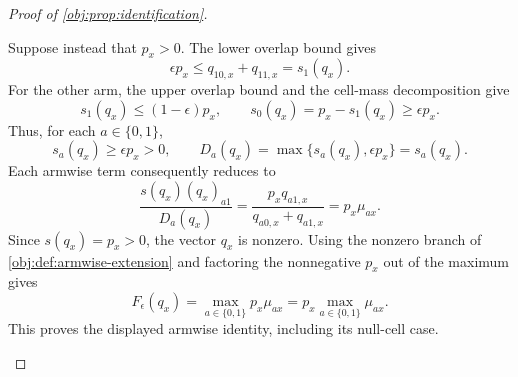 \documentclass[11pt]{article}
\begin{document}
\begin{proof}[Proof of \cref{obj:prop:identification}]
\begin{enumerate}
Suppose instead that \(p_x>0\). The lower overlap bound gives
\[
\epsilon p_x\le q_{10,x}+q_{11,x}=s_1(q_x).
\]
For the other arm, the upper overlap bound and the cell-mass decomposition give
\[
s_1(q_x)\le(1-\epsilon)p_x,
\qquad
s_0(q_x)=p_x-s_1(q_x)\ge\epsilon p_x.
\]
Thus, for each \(a\in\{0,1\}\),
\[
s_a(q_x)\ge\epsilon p_x>0,
\qquad
D_a(q_x)=\max\{s_a(q_x),\epsilon p_x\}=s_a(q_x).
\]
Each armwise term consequently reduces to
\[
\frac{s(q_x)(q_x)_{a1}}{D_a(q_x)}
=
\frac{p_xq_{a1,x}}{q_{a0,x}+q_{a1,x}}
=
p_x\mu_{ax}.
\]
Since \(s(q_x)=p_x>0\), the vector \(q_x\) is nonzero. Using the nonzero branch of \cref{obj:def:armwise-extension} and factoring the nonnegative \(p_x\) out of the maximum gives
\[
F_\epsilon(q_x)
=
\max_{a\in\{0,1\}}p_x\mu_{ax}
=
p_x\max_{a\in\{0,1\}}\mu_{ax}.
\]
This proves the displayed armwise identity, including its null-cell case.
\end{enumerate}
\end{proof}
\end{document}
